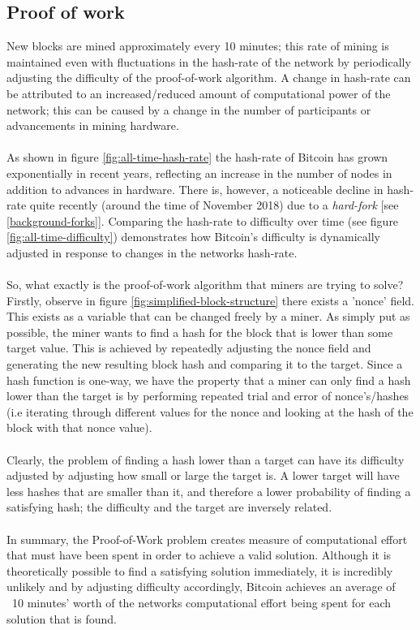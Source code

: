 \subsection{Proof of work}\label{background-proof-of-work}
New blocks are mined approximately every 10 minutes; this rate of mining is maintained even with fluctuations in the hash-rate of the network by periodically adjusting the difficulty of the proof-of-work algorithm. A change in hash-rate can be attributed to an increased/reduced amount of computational power of the network; this can be caused by a change in the number of participants or advancements in mining hardware.
\\\\
As shown in figure \ref{fig:all-time-hash-rate} the hash-rate of Bitcoin has grown exponentially in recent years, reflecting an increase in the number of nodes in addition to advances in hardware. There is, however, a noticeable decline in hash-rate quite recently (around the time of November 2018) due to a \textit{hard-fork} [see \ref{background-forks}]. Comparing the hash-rate to difficulty over time (see figure \ref{fig:all-time-difficulty}) demonstrates how Bitcoin's difficulty is dynamically adjusted in response to changes in the networks hash-rate. 
\\\\
So, what exactly is the proof-of-work algorithm that miners are trying to solve? Firstly, observe in figure \ref{fig:simplified-block-structure} there exists a 'nonce' field. This exists as a variable that can be changed freely by a miner. As simply put as possible, the miner wants to find a hash for the block that is lower than some target value. This is achieved by repeatedly adjusting the nonce field and generating the new resulting block hash and comparing it to the target. Since a hash function is one-way, we have the property that a miner can only find a hash lower than the target is by performing repeated trial and error of nonce's/hashes (i.e iterating through different values for the nonce and looking at the hash of the block with that nonce value).
\\\\
Clearly, the problem of finding a hash lower than a target can have its difficulty adjusted by adjusting how small or large the target is. A lower target will have less hashes that are smaller than it, and therefore a lower probability of finding a satisfying hash; the difficulty and the target are inversely related. 
\\\\
In summary, the Proof-of-Work problem creates measure of computational effort that must have been spent in order to achieve a valid solution. Although it is theoretically possible to find a satisfying solution immediately, it is incredibly unlikely and by adjusting difficulty accordingly, Bitcoin achieves an average of ~10 minutes' worth of the networks computational effort being spent for each solution that is found. 


